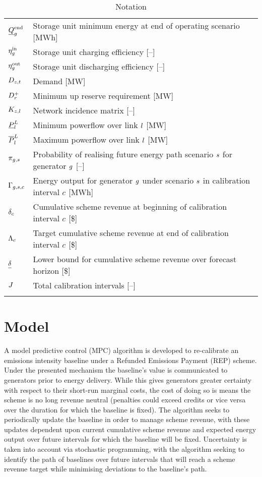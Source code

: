 \documentclass{article}
\begin{document}
\begin{longtable}{ p{}  p{}}
	$\underline{Q}^{\mathrm{end}}_{g}$ & Storage unit minimum energy at end of operating scenario [MWh]\\
	$\eta_{g}^{\mathrm{in}}$ & Storage unit charging efficiency [--]\\
	$\eta_{g}^{\mathrm{out}}$ & Storage unit discharging efficiency [--]\\
	$D_{z,t}$ & Demand [MW]\\
	$D^{+}_{r}$ & Minimum up reserve requirement [MW]\\
	$K_{z,l}$ & Network incidence matrix [--]\\
	$\underline{P}_{l}^{L}$ & Minimum powerflow over link $l$ [MW]\\
	$\overline{P}_{l}^{L}$ & Maximum powerflow over link $l$ [MW]\\
	$\pi_{g,s}$ & Probability of realising future energy path scenario $s$ for generator $g$ [--]\\
	$\Gamma_{g,s,c}$ & Energy output for generator $g$ under scenario $s$ in calibration interval $c$ [MWh]\\
	$\delta_{c}$ & Cumulative scheme revenue at beginning of calibration interval $c$ [\$]\\
	$\Lambda_{c}$ & Target cumulative scheme revenue at end of calibration interval $c$ [\$]\\
	$\underline{\delta_{}}$ & Lower bound for cumulative scheme revenue over forecast horizon [\$]\\
	$J$ & Total calibration intervals [--]\\
	\hline
	\caption{Notation}
\end{longtable}

\section{Model}
A model predictive control (MPC) algorithm is developed to re-calibrate an emissions intensity baseline under a Refunded Emissions Payment (REP) scheme. Under the presented mechanism the baseline's value is communicated to generators prior to energy delivery. While this gives generators greater certainty with respect to their short-run marginal costs, the cost of doing so is means the scheme is no long revenue neutral (penalties could exceed credits or vice versa over the duration for which the baseline is fixed). The algorithm seeks to periodically update the baseline in order to manage scheme revenue, with these updates dependent upon current cumulative scheme revenue and expected energy output over future intervals for which the baseline will be fixed. Uncertainty is taken into account via stochastic programming, with the algorithm seeking to identify the path of baselines over future intervals that will reach a scheme revenue target while minimising deviations to the baseline's path. 
\end{document}
